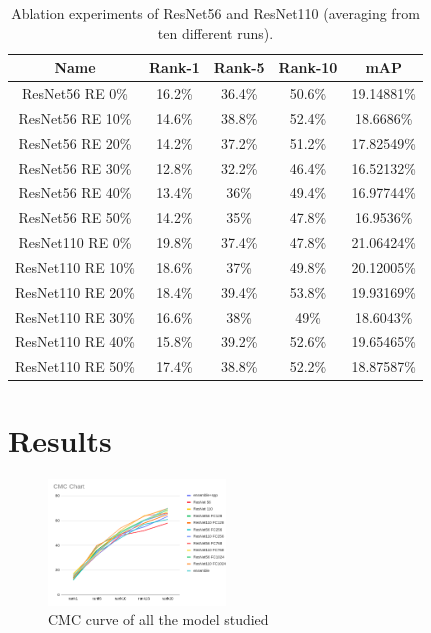 \documentclass[conference]{IEEEtran}
\begin{document}
	\begin{table}[h!]
		\begin{center}
			\begin{tabular}{|c|c|c|c|c|}
				\hline
				\textbf{Name} & \textbf{Rank-1} & \textbf{Rank-5} & \textbf{Rank-10} & \textbf{mAP} \\ \hline
				ResNet56 RE 0\% & 16.2\% & 36.4\% & 50.6\% & 19.14881\%\\ \hline
				ResNet56 RE 10\% & 14.6\% & 38.8\% & 52.4\% & 18.6686\%\\ \hline
				ResNet56 RE 20\% & 14.2\% & 37.2\% & 51.2\% & 17.82549\%\\ \hline
				ResNet56 RE 30\% & 12.8\% & 32.2\% & 46.4\% & 16.52132\%\\ \hline
				ResNet56 RE 40\% & 13.4\% & 36\% & 49.4\% & 16.97744\%\\ \hline
				ResNet56 RE 50\% & 14.2\% & 35\% & 47.8\% & 16.9536\%\\ \hline
				ResNet110 RE 0\% & 19.8\% & 37.4\% & 47.8\% & 21.06424\%\\ \hline
				ResNet110 RE 10\% & 18.6\% & 37\% & 49.8\% & 20.12005\%\\ \hline
				ResNet110 RE 20\% & 18.4\% & 39.4\% & 53.8\% & 19.93169\%\\ \hline
				ResNet110 RE 30\% & 16.6\% & 38\% & 49\% & 18.6043\%\\ \hline
				ResNet110 RE 40\% & 15.8\% & 39.2\% & 52.6\% & 19.65465\%\\ \hline
				ResNet110 RE 50\% & 17.4\% & 38.8\% & 52.2\% & 18.87587\%\\ \hline
			\end{tabular}
		\end{center}
		\vspace{1ex}
		\caption{Ablation experiments of ResNet56 and ResNet110 (averaging from ten different runs).}
		\label{tabel:re}
	\end{table}
	
	
	\section{Results}
	\vspace{1ex}
	
	\begin{figure}[h!] \centering
		\includegraphics[width=0.42\textwidth]{img/CMC.png}
		\caption{CMC curve of all the model studied}
		\label{fig:6}
	\end{figure}
	
\end{document}
